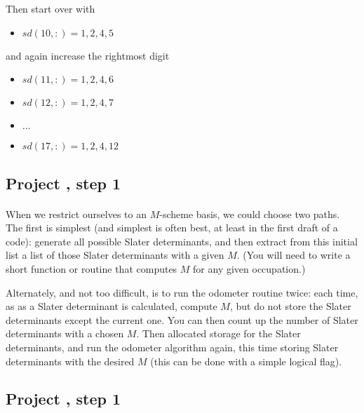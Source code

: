 \documentclass[%
twoside,                 %
final,                   %
10pt]{article}
\begin{document}
\noindent
Then start over with 
\begin{itemize}
\item $sd(10,:)= 1,2,4,5$
\end{itemize}

\noindent
and again increase the rightmost digit

\begin{itemize}
\item $sd(11,:)= 1,2,4,6$

\item $sd(12,:)= 1,2,4,7$

\item $\ldots$

\item $sd(17,:)= 1,2,4,12$
\end{itemize}

\noindent



\subsection{Project , step 1}

\paragraph{}
When we restrict ourselves to an $M$-scheme basis, we could choose two paths. 
The first is simplest (and simplest is often best, at 
least in the first draft of a code): generate all possible Slater determinants, 
and then extract from this initial list a list of those Slater determinants with a given 
$M$. (You will need to write a short function or routine that computes $M$ for any 
given occupation.)  


Alternately, and not too difficult, is to run the odometer routine twice: each time, as 
as a Slater determinant is calculated, compute $M$, but do not store the Slater determinants 
except the current one. You can then count up the number of Slater determinants with a 
chosen $M$.  Then allocated storage for the Slater determinants, and run the odometer 
algorithm again, this time storing Slater determinants with the desired $M$ (this can be 
done with a simple logical flag).




\subsection{Project , step 1}
\end{document}
